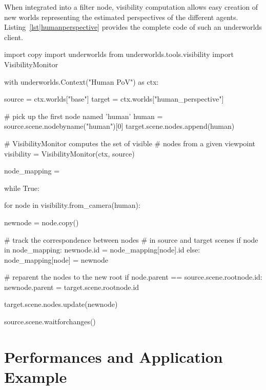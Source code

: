 \documentclass[letterpaper, 10pt, conference]{ieeeconf}
\newcommand{\uwds}{{\sc underworlds}\xspace}
\begin{document}
When integrated into a filter node, visibility computation allows easy
creation of new worlds representing the estimated perspectives of the different
agents. Listing~\ref{lst|humanperspective} provides the complete code of such an
\uwds client.


\begin{listing}[h!]
\begin{pythoncode}
import copy
import underworlds
from underworlds.tools.visibility import VisibilityMonitor

with underworlds.Context("Human PoV") as ctx:

    source = ctx.worlds["base"]
    target = ctx.worlds["human_perspective"]

    # pick up the first node named 'human'
    human = source.scene.nodebyname("human")[0]
    target.scene.nodes.append(human)

    # VisibilityMonitor computes the set of visible 
    # nodes from a given viewpoint
    visibility = VisibilityMonitor(ctx, source)

    node_mapping = {}

    while True:

        for node in visibility.from_camera(human):

            newnode = node.copy()

            # track the correspondence between nodes
            # in source and target scenes
            if node in node_mapping:
                newnode.id = node_mapping[node].id
            else:
                node_mapping[node] = newnode

            # reparent the nodes to the new root
            if node.parent == source.scene.rootnode.id:
                newnode.parent = target.scene.rootnode.id

            target.scene.nodes.update(newnode)

        source.scene.waitforchanges()

\end{pythoncode}
    \caption{Example of an \uwds client that creates a world named {\tt
    human\_perspective} from a source world {\tt base} by only updating objects
    that are in the field of view of the human. As such, {\tt human\_perspective} is
    a real-time model of the human perspective on the scene.}

    \label{lst|humanperspective}
\end{listing}


\section{Performances and Application Example}
\label{application}
\end{document}

